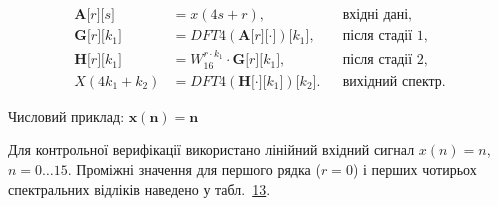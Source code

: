 \[\begin{aligned}
\mathbf{A}\lbrack r\rbrack\lbrack s\rbrack & = x(4s + r), & & \text{вхідні дані,} \\
\mathbf{G}\lbrack r\rbrack\lbrack k_{1}\rbrack & = DFT4(\mathbf{A}\lbrack r\rbrack\lbrack \cdot \rbrack)\lbrack k_{1}\rbrack, & & \text{після стадії 1,} \\
\mathbf{H}\lbrack r\rbrack\lbrack k_{1}\rbrack & = W_{16}^{r \cdot k_{1}} \cdot \mathbf{G}\lbrack r\rbrack\lbrack k_{1}\rbrack, & & \text{після стадії 2,} \\
X(4k_{1} + k_{2}) & = DFT4(\mathbf{H}\lbrack \cdot \rbrack\lbrack k_{1}\rbrack)\lbrack k_{2}\rbrack. & & \text{вихідний спектр.}
\end{aligned}\]

Числовий приклад: \(\mathbf{x(n) = n}\)

Для контрольної верифікації використано лінійний вхідний сигнал
\(x(n) = n\), \(n = 0\ldots 15\). Проміжні значення для першого рядка
(\(r = 0\)) і перших чотирьох спектральних відліків наведено у
табл.~\hyperref[tab:numerical]{13}.

